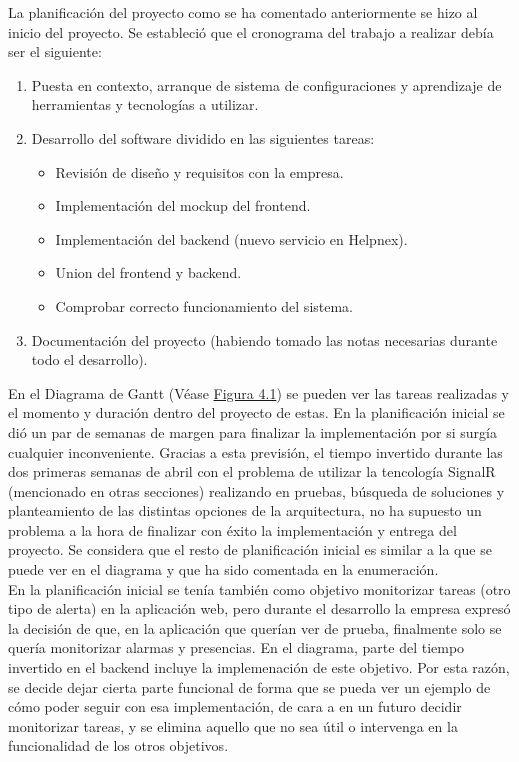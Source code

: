 La planificación del proyecto como se ha comentado anteriormente se hizo al inicio del proyecto. Se estableció que el cronograma del trabajo a realizar debía ser el siguiente:
\begin{enumerate}
    \item Puesta en contexto, arranque de sistema de configuraciones y aprendizaje de herramientas y tecnologías a utilizar.
    \item Desarrollo del software dividido en las siguientes tareas:
    \begin{itemize}
        \item Revisión de diseño y requisitos con la empresa.
        \item Implementación del mockup del frontend.
        \item Implementación del backend (nuevo servicio en Helpnex).
        \item Union del frontend y backend.
        \item Comprobar correcto funcionamiento del sistema.
    \end{itemize}
    \item Documentación del proyecto (habiendo tomado las notas necesarias durante todo el desarrollo).
\end{enumerate}

En el Diagrama de Gantt (Véase \hyperref[fig:gantt]{Figura 4.1}) se pueden ver las tareas realizadas y el momento y duración dentro del proyecto de estas. En la planificación inicial se dió un par de semanas de margen para finalizar la implementación por si surgía cualquier inconveniente. Gracias a esta previsión, el tiempo invertido durante las dos primeras semanas de abril con el problema de utilizar la tencología SignalR (mencionado en otras secciones) realizando en pruebas, búsqueda de soluciones y planteamiento de las distintas opciones de la arquitectura, no ha supuesto un problema a la hora de finalizar con éxito la implementación y entrega del proyecto. Se considera que el resto de planificación inicial es similar a la que se puede ver en el diagrama y que ha sido comentada en la enumeración. \\

En la planificación inicial se tenía también como objetivo monitorizar tareas (otro tipo de alerta) en la aplicación web, pero durante el desarrollo la empresa expresó la decisión de que, en la aplicación que querían ver de prueba, finalmente solo se quería monitorizar alarmas y presencias. En el diagrama, parte del tiempo invertido en el backend incluye la implemenación de este objetivo. Por esta razón, se decide dejar cierta parte funcional de forma que se pueda ver un ejemplo de cómo poder seguir con esa implementación, de cara a en un futuro decidir monitorizar tareas, y se elimina aquello que no sea útil o intervenga en la funcionalidad de los otros objetivos.

